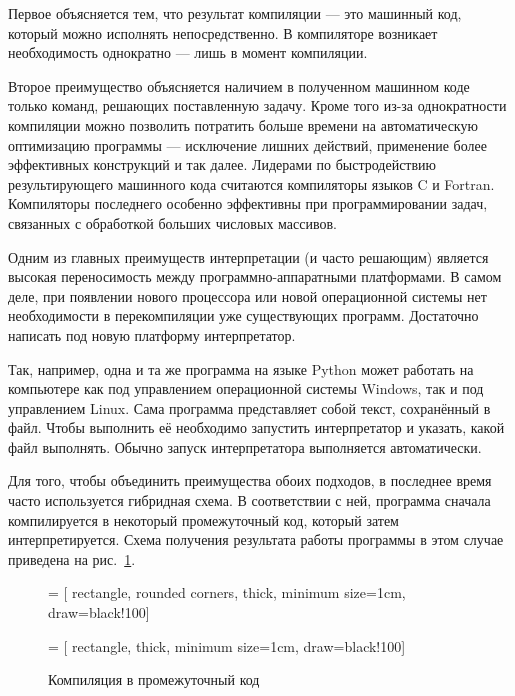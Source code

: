 Первое объясняется тем, что результат компиляции — это машинный код,
который можно исполнять непосредственно. В компиляторе возникает
необходимость однократно — лишь в момент компиляции.

Второе преимущество объясняется наличием в полученном машинном коде
только команд, решающих поставленную задачу. Кроме того из-за
однократности компиляции можно позволить потратить больше времени на
автоматическую оптимизацию программы — исключение лишних действий,
применение более эффективных конструкций и так далее. Лидерами по
быстродействию результирующего машинного кода считаются компиляторы
языков C и Fortran. Компиляторы последнего особенно эффективны при
программировании задач, связанных с обработкой больших числовых
массивов.

Одним из главных преимуществ интерпретации (и часто решающим) является
высокая переносимость между программно-аппаратными платформами. В
самом деле, при появлении нового процессора или новой операционной
системы нет необходимости в перекомпиляции уже существующих программ.
Достаточно написать под новую платформу интерпретатор.

Так, например, одна и та же программа на языке Python может работать
на компьютере как под управлением операционной системы Windows, так и
под управлением Linux. Сама программа представляет собой текст,
сохранённый в файл. Чтобы выполнить её необходимо запустить
интерпретатор и указать, какой файл выполнять. Обычно запуск
интерпретатора выполняется автоматически.

Для того, чтобы объединить преимущества обоих подходов, в последнее
время часто используется гибридная схема. В соответствии с ней,
программа сначала компилируется в некоторый промежуточный код, который
затем интерпретируется. Схема получения результата работы программы в
этом случае приведена на рис.~\ref{fig:pcode}.

\begin{figure}
  \begin{centering}
     = [
      rectangle,
      rounded corners,
      thick,
      minimum size=1cm,
      draw=black!100]
    
     = [
      rectangle,
      thick,
      minimum size=1cm,
      draw=black!100]
    
    \par
  \end{centering}
  
  \caption{Компиляция в промежуточный код\label{fig:pcode}}
\end{figure}

